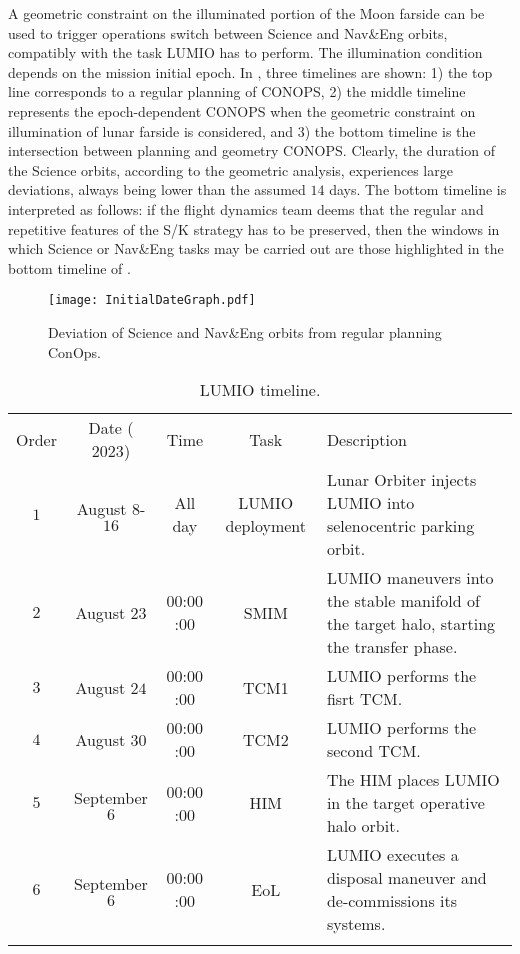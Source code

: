 A geometric constraint on the illuminated portion of the Moon farside can be used to trigger operations switch between Science and Nav\&Eng orbits, compatibly with the task LUMIO has to perform. The illumination condition depends on the mission initial epoch. In , three timelines are shown: 1) the top line corresponds to a regular planning of {CONOPS}, 2) the middle timeline represents the epoch-dependent {CONOPS} when the geometric constraint on illumination of lunar farside is considered, and 3) the bottom timeline is the intersection between planning and geometry {CONOPS}. Clearly, the duration of the Science orbits, according to the geometric analysis, experiences large deviations, always being lower than the assumed $14$ days. The bottom timeline is interpreted as follows: if the flight dynamics team deems that the regular and repetitive features of the S/K strategy has to be preserved, then the windows in which Science or Nav\&Eng tasks may be carried out are those highlighted in the bottom timeline of .
%
\begin{figure*}[t!]
	\centering
	\texttt{[image: InitialDateGraph.pdf]}
	\caption[Deviations from regular ConOps planning.]{Deviation of Science and Nav\&Eng orbits from regular planning ConOps.}
	\label{fig:InitialDateGraph}
\end{figure*}
%
%
\begin{table*}[h!]
	\caption{LUMIO timeline.}
	\label{tab:Timeline}
	\centering
	\small
	\begin{tabularx}{\textwidth}{ccccX}
		\TOPlines
		Order & Date ($2023$) & Time & Task & Description \\
		\MIDline
		$1$ & August $8$-$16$ & All day & LUMIO deployment & Lunar Orbiter injects LUMIO into selenocentric parking orbit. \\
		$2$ & August $23$ & $00$:$00$:$00$ & {SMIM} & LUMIO maneuvers into the stable manifold of the target halo, starting the transfer phase. \\
		$3$ & August $24$ & $00$:$00$:$00$ & TCM1 & LUMIO performs the fisrt {TCM}. \\
		$4$ & August $30$ & $00$:$00$:$00$ & TCM2 & LUMIO performs the second {TCM}. \\
		$5$ & September $6$ & $00$:$00$:$00$ & {HIM} & The {HIM} places LUMIO in the target operative halo orbit. \\
		$6$ & September $6$ & $00$:$00$:$00$ & {EoL} & LUMIO executes a disposal maneuver and de-commissions its systems. \\
		\BOTTOMlines
	\end{tabularx}
\end{table*}
%

